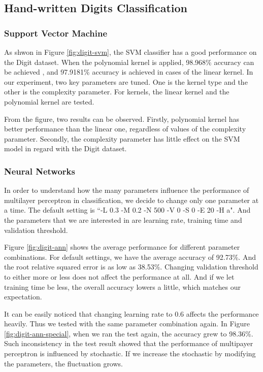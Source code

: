 \documentclass[11pt]{article}
\begin{document}
\subsection{Hand-written Digits Classification}
\subsubsection{Support Vector Machine}

As shwon in Figure \ref{fig:digit-svm}, the SVM classifier has a good performance on the Digit dataset. When the polynomial kernel is applied, 98.968\% accuracy can be achieved , and 97.9181\% accuracy is achieved in cases of the linear kernel. In our experiment, two key parameters are tuned. One is the kernel type and the other is the complexity parameter. For kernels, the linear kernel and the polynomial kernel are tested. 

From the figure, two results can be observed. Firstly, polynomial kernel has better performance than the linear one, regardless of values of the complexity parameter. Secondly, the complexity parameter has little effect on the SVM model in regard with the Digit dataset. 

\subsubsection{Neural Networks}
In order to understand how the many parameters influence the performance of multilayer perceptron in classification, we decide to change only one parameter at a time. The default setting is ``-L 0.3 -M 0.2 -N 500 -V 0 -S 0 -E 20 -H a". And the parameters that we are interested in are learning rate, training time and validation threshold.

Figure \ref{fig:digit-ann} shows the average performance for different parameter combinations. For default settings, we have the average accuracy of 92.73\%. And the root relative squared error is as low as 38.53\%. Changing validation threshold to either more or less does not affect the performance at all. And if we let training time be less, the overall accuracy lowers a little, which matches our expectation.

It can be easily noticed that changing learning rate to 0.6 affects the performance heavily. Thus we tested with the same parameter combination again. In Figure \ref{fig:digit-ann-special}, when we ran the test again, the accuracy grew to 98.36\%. Such inconsistency in the test result showed that the performance of multipayer perceptron is influenced by stochastic. If we increase the stochastic by modifying the parameters, the fluctuation grows.
\end{document}
